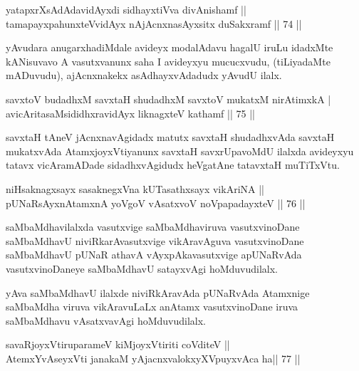 
\begin{shl}
yatapxrXsAdAdavidAyxdi sidhayxtiVva divAnishamf ||  \\
tamapayxpahunxteV\s vidAyx nAjAcnxnasAyxsitx duSakxramf \hfill||  74 ||  
\end{shl}

\begin{artha}
yAvudara anugarxhadiMdale avideyx modalAdavu hagalU iruLu idadxMte kANisuvavo A vasutxvanunx saha I avideyxyu mucucxvudu, (tiLiyadaMte mADuvudu), ajAcnxnakekx asAdhayxvAdadudx yAvudU ilalx.
\end{artha}

\begin{shl}
savxtoV budadhxM savxtaH shudadhxM savxtoV mukatxM nirAtimxkA | \\
avicAritasaMsididhxravidAyx liknagxteV kathamf \hfill||  75 ||  
\end{shl}

\begin{artha}
savxtaH tAneV jAcnxnavAgidadx matutx savxtaH shudadhxvAda savxtaH mukatxvAda AtamxjoyxVtiyanunx savxtaH savxrUpavoMdU ilalxda avideyxyu tatavx vicAramADade sidadhxvAgidudx heVgatAne tatavxtaH muTiTxVtu.
\end{artha}

\begin{shl}
niHsaknagxsayx sasaknegxVna kUTasathxsayx vikAriNA ||  \\
pUNaRsAyxnAtamxnA yoVgoV vAsatxvoV noVpapadayxteV \hfill||  76 ||  
\end{shl}

\begin{artha}
saMbaMdhavilalxda vasutxvige saMbaMdhaviruva vasutxvinoDane saMbaMdhavU niviRkarAvasutxvige vikAravAguva vasutxvinoDane saMbaMdhavU pUNaR athavA vAyxpAkavasutxvige apUNaRvAda vasutxvinoDaneye saMbaMdhavU satayxvAgi hoMduvudilalx.

yAva saMbaMdhavU ilalxde niviRkAravAda pUNaRvAda Atamxnige saMbaMdha viruva vikAravuLaLx anAtamx vasutxvinoDane iruva saMbaMdhavu vAsatxvavAgi hoMduvudilalx.
\end{artha}

\begin{shl}
savaRjoyxVtiruparameV kiMjoyxVtiriti coVditeV ||  \\
AtemxYvAseyxVti janakaM yAjacnxvalokxyXV\s puyxvAca ha\hfill ||  77 ||  
\end{shl}

